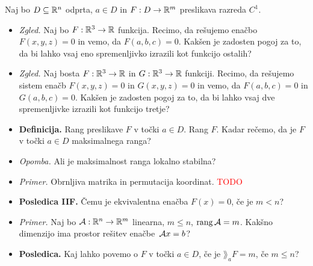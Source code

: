 \begin{enumerate}
    Naj bo $D \subseteq \mathbb{R}^n$ odprta, $a \in D$ in $F: D \to \mathbb{R}^m$ preslikava razreda $C^1$.
    \begin{itemize}
        \item \colorbox{yellow!30}{\emph{Zgled.}} Naj bo $F: \mathbb{R}^3 \to \mathbb{R}$ funkcija. Recimo, da rešujemo enačbo $F(x,y,z) = 0$ in vemo, da $F(a,b,c) = 0$. Kakšen je zadosten pogoj za to, da bi lahko vsaj eno spremenljivko izrazili kot funkcijo ostalih?
        \item \colorbox{yellow!30}{\emph{Zgled.}} Naj bosta $F: \mathbb{R}^3 \to \mathbb{R}$ in $G: \mathbb{R}^3 \to \mathbb{R}$ funkciji. Recimo, da rešujemo sistem enačb $F(x,y,z) = 0$ in $G(x,y,z) = 0$ in vemo, da  $F(a,b,c) = 0$ in  $G(a,b,c) = 0$. Kakšen je zadosten pogoj za to, da bi lahko vsaj dve spremenljivke izrazili kot funkcijo tretje?
        \item \colorbox{purple!30}{\textbf{Definicija.}} Rang preslikave $F$ v točki $a \in D$. Rang $F$. Kadar rečemo, da je $F$ v točki $a \in D$ maksimalnega ranga?
        \item \colorbox{yellow!30}{\emph{Opomba.}} Ali je maksimalnost ranga lokalno stabilna?
        \item \colorbox{yellow!30}{\emph{Primer.}} Obrnljiva matrika in permutacija koordinat. \textcolor{red}{TODO}
        \item \colorbox{orange!30}{\textbf{Posledica IIF.}} Čemu je ekvivalentna enačba $F(x) = 0$, če je $m < n$?
        \item \colorbox{yellow!30}{\emph{Primer.}} Naj bo $\mathcal{A}: \mathbb{R}^n \to \mathbb{R}^m$ linearna, $m \leq n$, $\operatorname{rang} \mathcal{A} = m$. Kakšno dimenzijo ima prostor rešitev enačbe~$\mathcal{A}x=b$?
        \item \colorbox{orange!30}{\textbf{Posledica.}} Kaj lahko povemo o $F$ v točki $a \in D$, če je $\rang_a F = m$, če $m \leq n$?
    \end{itemize}
\end{enumerate}


